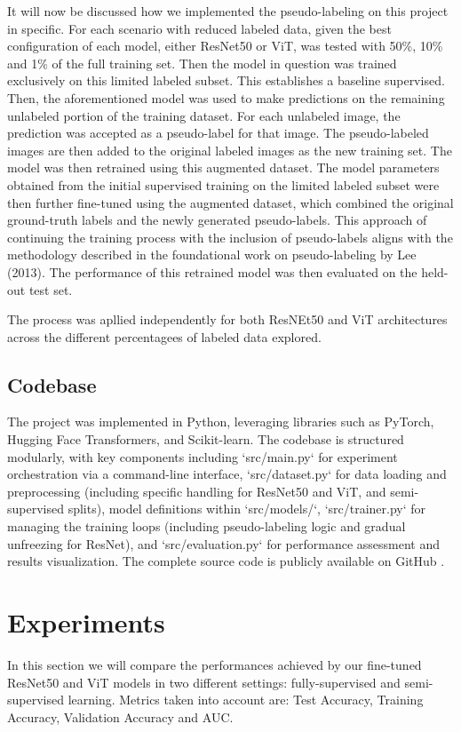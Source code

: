 \documentclass{article}
\begin{document}
It will now be discussed how we implemented the pseudo-labeling on this project in specific. For each scenario with reduced labeled data, given the best configuration of each model, either ResNet50 or ViT, was tested with 50\%, 10\% and 1\% of the full training set. Then the model in question was trained exclusively on this limited labeled subset. This establishes a baseline supervised. Then, the aforementioned model was used to make predictions on the remaining unlabeled portion of the training dataset. For each unlabeled image, the prediction was accepted as a pseudo-label for that image. The pseudo-labeled images are then added to the original labeled images as the new training set. The model was then retrained using this augmented dataset. The model parameters obtained from the initial supervised training on the limited labeled subset were then further fine-tuned using the augmented dataset, which combined the original ground-truth labels and the newly generated pseudo-labels. This approach of continuing the training process with the inclusion of pseudo-labels aligns with the methodology described in the foundational work on pseudo-labeling by Lee (2013)\cite{lee2013pseudo}. The performance of this retrained model was then evaluated on the held-out test set.  

The process was apllied independently for both ResNEt50 and ViT architectures across the different percentagees of labeled data explored. 

\subsection{Codebase}
The project was implemented in Python, leveraging libraries such as PyTorch, Hugging Face Transformers, and Scikit-learn. The codebase is structured modularly, with key components including `src/main.py` for experiment orchestration via a command-line interface, `src/dataset.py` for data loading and preprocessing (including specific handling for ResNet50 and ViT, and semi-supervised splits), model definitions within `src/models/`, `src/trainer.py` for managing the training loops (including pseudo-labeling logic and gradual unfreezing for ResNet), and `src/evaluation.py` for performance assessment and results visualization. The complete source code is publicly available on GitHub \cite{OurProject}.

\section{Experiments}
In this section we will compare the performances achieved by our fine-tuned ResNet50 and ViT models in two different settings: fully-supervised and semi-supervised learning. Metrics taken into account are: Test Accuracy, Training Accuracy, Validation Accuracy and AUC.
\end{document}

